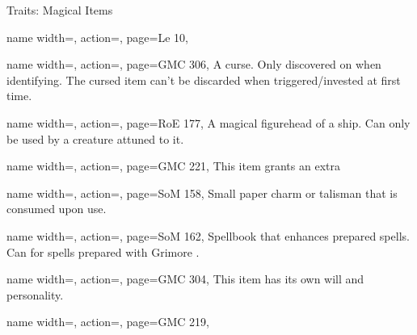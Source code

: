 \begin{PageBack}
\begin{Tables}{\backTableHeight}
\begin{Table}{Traits: Magical Items}
\begin{entry}{}{%
                name width=\conditionLength,%
                action=\Contract,
                page=Le 10,
            }
            \end{entry}
            \begin{entry}{}{%
                name width=\conditionLength,%
                action=\Cursed,
                page=GMC 306,
            }
                A curse. Only discovered on  when identifying. The cursed item can't be discarded when
                triggered/invested at first time.
            \end{entry}
            \begin{entry}{}{%
                name width=\conditionLength,%
                action=\Figurehead,
                page=RoE 177,
            }
                A magical figurehead of a ship. Can only be used by a creature attuned to it. \hfill {}
            \end{entry}
            \begin{entry}{}{%
                name width=\conditionLength,%
                action=\Focused,
                page=GMC 221,
            }
                This item grants an extra  \hfill{}
            \end{entry}
            \begin{entry}{}{%
                name width=\conditionLength,%
                action=\Fulu,
                page=SoM 158,
            }
                Small paper charm or talisman that is consumed upon use. 
            \end{entry}
            \begin{entry}{}{%
                name width=\conditionLength,%
                action=\Grimoire,
                page=SoM 162,
            }
                Spellbook that enhances prepared spells. Can  for spells prepared with Grimore
                . \hfill{}
            \end{entry}
            \begin{entry}{}{%
                name width=\conditionLength,%
                action=\Intelligent,
                page=GMC 304,
            }
                This item has its own will and personality.
            \end{entry}
            \begin{entry}{}{%
                name width=\conditionLength,%
                action=\Invested,
                page=GMC 219,
            }

\end{entry}
\end{Table}
\end{Tables}
\end{PageBack}
